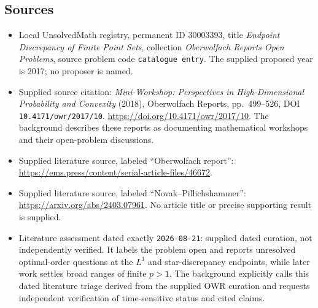 \documentclass[11pt]{article}
\begin{document}
\subsection{Sources}
\begin{itemize}
\item Local UnsolvedMath registry, permanent ID \(30003393\), title \emph{Endpoint Discrepancy of Finite Point Sets}, collection \emph{Oberwolfach Reports Open Problems}, source problem code \texttt{catalogue entry}. The supplied proposed year is 2017; no proposer is named.
\item Supplied source citation: \emph{Mini-Workshop: Perspectives in High-Dimensional Probability and Convexity} (2018), Oberwolfach Reports, pp.~499--526, DOI \texttt{10.4171/owr/2017/10}. \url{https://doi.org/10.4171/owr/2017/10}. The background describes these reports as documenting mathematical workshops and their open-problem discussions.
\item Supplied literature source, labeled ``Oberwolfach report'': \url{https://ems.press/content/serial-article-files/46672}.
\item Supplied literature source, labeled ``Novak--Pillichshammer'': \url{https://arxiv.org/abs/2403.07961}. No article title or precise supporting result is supplied.
\item Literature assessment dated exactly \texttt{2026-08-21}: supplied dated curation, not independently verified. It labels the problem open and reports unresolved optimal-order questions at the \(L^1\) and star-discrepancy endpoints, while later work settles broad ranges of finite \(p>1\). The background explicitly calls this dated literature triage derived from the supplied OWR curation and requests independent verification of time-sensitive status and cited claims.
\end{itemize}
\end{document}

